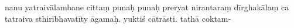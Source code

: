 \documentclass[12pt]{article}
\begin{document}
% 

nanu yatraivālambane cittaṃ punaḥ punaḥ preryat nirantaraṃ\footnoteB{
	nirantaraṃ] \EDD\ (\emd) \TIB\ (rgyun mi 'chad par); niruttaraṃ \MS
} dīrghakālaṃ ca tatraiva sthirībhavatīty āgamaḥ. yuktiś cātrāsti. tathā coktam-

% 
\end{document}
